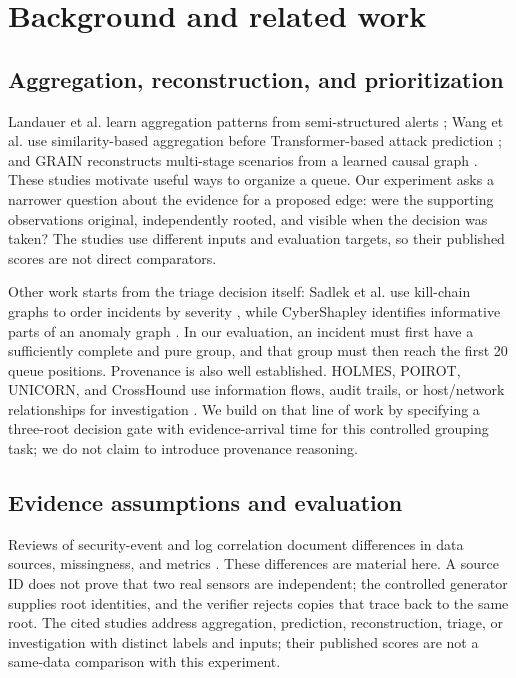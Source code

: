 \section{Background and related work}
\subsection{Aggregation, reconstruction, and prioritization}
Landauer et al. learn aggregation patterns from semi-structured alerts \cite{landauer2022}; Wang et al. use similarity-based aggregation before Transformer-based attack prediction \cite{wang2024}; and GRAIN reconstructs multi-stage scenarios from a learned causal graph \cite{grain2025}. These studies motivate useful ways to organize a queue. Our experiment asks a narrower question about the evidence for a proposed edge: were the supporting observations original, independently rooted, and visible when the decision was taken? The studies use different inputs and evaluation targets, so their published scores are not direct comparators.

Other work starts from the triage decision itself: Sadlek et al. use kill-chain graphs to order incidents by severity \cite{sadlek2025}, while CyberShapley identifies informative parts of an anomaly graph \cite{malach2025}. In our evaluation, an incident must first have a sufficiently complete and pure group, and that group must then reach the first 20 queue positions. Provenance is also well established. HOLMES, POIROT, UNICORN, and CrossHound use information flows, audit trails, or host/network relationships for investigation \cite{holmes2019,poirot2019,unicorn2020,crosshound2026}. We build on that line of work by specifying a three-root decision gate with evidence-arrival time for this controlled grouping task; we do not claim to introduce provenance reasoning.

\subsection{Evidence assumptions and evaluation}
Reviews of security-event and log correlation document differences in data sources, missingness, and metrics \cite{review2022,chuah2025}. These differences are material here. A source ID does not prove that two real sensors are independent; the controlled generator supplies root identities, and the verifier rejects copies that trace back to the same root. The cited studies address aggregation, prediction, reconstruction, triage, or investigation with distinct labels and inputs; their published scores are not a same-data comparison with this experiment.
